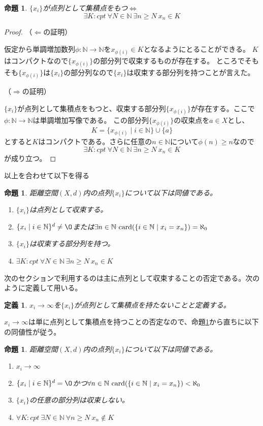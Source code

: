 \documentclass[leqno]{jsarticle}
\newtheorem{prop}[thm]{命題}
\newtheorem{df}[thm]{定義}
\newcommand{\nn}{\mathbb{N}}
\newcommand{\card}{\text{{\rm card}}}
\begin{document}
\begin{prop}
$\{x_i\}$が点列として集積点をもつ$\iff$
\[
\exists K:cpt\ \forall N\in \nn\ \exists n\ge N\ x_n\in K
\]
\end{prop}
\begin{proof}
（$\Longleftarrow$の証明）
\par
仮定から単調増加数列$\phi:\nn\to \nn$を$x_{\phi(i)}\in K$となるようにとることができる。
$K$はコンパクトなので$\{x_{\phi(i)}\}$の部分列で収束するものが存在する。
ところでそもそも$\{x_{\phi(i)}\}$は$\{x_i\}$の部分列なので$\{x_i\}$は収束する部分列を持つことが言えた。
\par
（$\Longrightarrow$の証明）
\par
$\{x_i\}$が点列として集積点をもつと、収束する部分列$\{x_{\phi(i)}\}$が存在する。ここで$\phi:\nn\to \nn$は単調増加写像である。
この部分列$\{x_{\phi(i)}\}$の収束点を$a\in X$とし、
\[
K=\{x_{\phi(i)}\mid i\in \nn\}\cup \{a\}
\]
とすると$K$はコンパクトである。さらに任意の$n\in \nn$について$\phi(n)\ge n$なので
\[
\exists K:cpt\ \forall N\in \nn\ \exists n\ge N\ x_n\in K
\]
が成り立つ。
\end{proof}
以上を合わせて以下を得る
\begin{prop}\label{ensemble}
距離空間$(X,d)$内の点列$\{x_i\}$について以下は同値である。
\begin{enumerate}
\item $\{x_i\}$は点列として収束する。
\item $\{x_i\mid i\in \nn\}^d\neq \O$または$\exists n\in \nn\ \card(\{i\in \nn\mid x_i=x_n\})=\aleph_0$
\item $\{x_i\}$は収束する部分列を持つ。
\item $\exists K:cpt\ \forall N\in \nn\ \exists n\ge N\ x_n\in K$
\end{enumerate}
\end{prop}
次のセクションで利用するのは主に点列として収束することの否定である。次のように定義して用いる。
\begin{df}
$x_i\to \infty$を$\{x_i\}$が点列として集積点を持たないことと定義する。
\end{df}
$x_i\to \infty$は単に点列として集積点を持つことの否定なので、命題\ref{ensemble}から直ちに以下の同値性が従う。
\begin{prop}
距離空間$(X,d)$内の点列$\{x_i\}$について以下は同値である。
\begin{enumerate}
\item $x_i\to \infty$
\item $\{x_i\mid i\in \nn\}^d= \O$かつ$\forall n\in \nn\ \card(\{i\in \nn\mid x_i=x_n\})<\aleph_0$
\item $\{x_i\}$の任意の部分列は収束しない。
\item $\forall K:cpt\ \exists N\in \nn\ \forall n\ge N\ x_n\not\in K$
\end{enumerate}
\end{prop}
\end{document}
